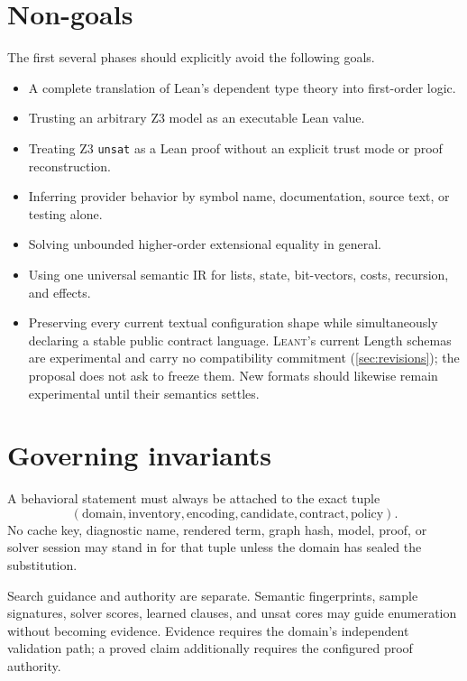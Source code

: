 \documentclass[11pt,oneside]{report}
\newcommand{\Leant}{\textsc{Leant}\xspace}
\begin{document}
\section{Non-goals}

The first several phases should explicitly avoid the following goals.

\begin{itemize}[leftmargin=2em]
\item A complete translation of Lean's dependent type theory into first-order logic.
\item Trusting an arbitrary Z3 model as an executable Lean value.
\item Treating Z3 \texttt{unsat} as a Lean proof without an explicit trust mode or proof reconstruction.
\item Inferring provider behavior by symbol name, documentation, source text, or testing alone.
\item Solving unbounded higher-order extensional equality in general.
\item Using one universal semantic IR for lists, state, bit-vectors, costs, recursion, and effects.
\item Preserving every current textual configuration shape while simultaneously declaring a stable public contract language. \Leant's current Length schemas are experimental and carry no compatibility commitment (\cref{sec:revisions}); the proposal does not ask to freeze them. New formats should likewise remain experimental until their semantics settles.
\end{itemize}

\section{Governing invariants}

\begin{designrule}
A behavioral statement must always be attached to the exact tuple
\[
(\text{domain},\text{inventory},\text{encoding},\text{candidate},\text{contract},\text{policy}).
\]
No cache key, diagnostic name, rendered term, graph hash, model, proof, or solver session may stand in for that tuple unless the domain has sealed the substitution.
\end{designrule}

\begin{designrule}
Search guidance and authority are separate. Semantic fingerprints, sample signatures, solver scores, learned clauses, and unsat cores may guide enumeration without becoming evidence. Evidence requires the domain's independent validation path; a proved claim additionally requires the configured proof authority.
\end{designrule}
\end{document}
